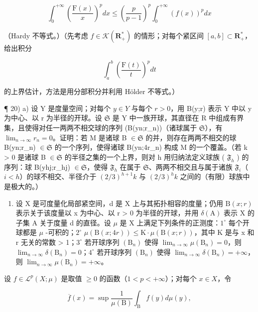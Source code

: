\[
\int_ {0} ^ {+ \infty} \left(\frac {\mathrm{F} (x)}{x}\right) ^ {p} d x \leqslant \left(\frac {p}{p - 1}\right) ^ {p} \int_ {0} ^ {+ \infty} (f (x)) ^ {p} d x
\]

（Hardy 不等式。）（先考虑 \(f \in \mathcal{K}(\mathbf{R}_+^*)\) 的情形；对每个紧区间 \([a, b] \subset \mathbf{R}_+^*\)，给出积分

\[
\int_ {a} ^ {b} \left(\frac {\mathrm{F} (t)}{t}\right) ^ {p} d t
\]

的上界估计，方法是用分部积分并利用 Hölder 不等式。）

¶ 20) a) 设 Y 是度量空间；对每个 \(y \in Y\) 与每个 \(r > 0\)，用 B(y;r) 表示 Y 中以 y 为中心、以 r 为半径的开球。设 \(\mathfrak{S}\) 是 Y 中一族开球，其直径在 R 中组成有界集，且使得对任一两两不相交球的序列 (B(yn;r\_n))（诸球属于 \(\mathfrak{S}\)），有 \(\lim_{n \to \infty} r_n = 0\)。证明：若 M 是诸球 B \(\in \mathfrak{S}\) 的并，则存在两两不相交的球 B(yn;r\_n) \(\in \mathfrak{S}\) 的一个序列，使得诸球 B(yn;4r\_n) 构成 M 的一个覆盖。（若 k \textgreater{} 0 是诸球 B \(\in \mathfrak{S}\) 的半径之集的一个上界，则对 h 用归纳法定义球族 ( \(\mathfrak{F}_h\) ) 的序列：球 B(yhj;r\_hj) \(\in \mathfrak{S}\)，使得 \(\mathfrak{F}_h\) 在属于 \(\mathfrak{S}\)、两两不相交且与属于诸族 \(\mathfrak{F}_i\)（\(i < h\)）的球不相交、半径介于 \((2/3)^{h+1}k\) 与 \((2/3)^h k\) 之间的（有限）球族中是极大的。）

\begin{enumerate}
\def\labelenumi{\alph{enumi})}
\setcounter{enumi}{1}
\tightlist
\item
  设 X 是可度量化局部紧空间，d 是 X 上与其拓扑相容的度量；仍用 \(\mathrm{B}(x;r)\) 表示关于该度量以 x 为中心、以 r \textgreater{} 0 为半径的开球，并用 \(\delta(\mathrm{A})\) 表示 X 的子集 A 关于度量 d 的直径。设 \(\mu\) 是 X 上满足下列条件的正测度：\(1^{\circ}\) 每个开球都是 \(\mu\) -可积的；\(2^{\circ}\) \(\mu(\mathrm{B}(x;4r)) \leqslant \mathrm{K} \cdot \mu(\mathrm{B}(x;r))\)，其中 K 是与 x 和 r 无关的常数 \textgreater{} 1；\(3^{\circ}\) 若开球序列 \((\mathrm{B}_{n})\) 使得 \(\lim_{n \to \infty} \mu(\mathrm{B}_{n}) = 0\)，则 \(\lim_{n \to \infty} \delta(\mathrm{B}_{n}) = 0\)；\(4^{\circ}\) 若开球序列 \((\mathrm{B}_{n})\) 使得 \(\lim_{n \to \infty} \delta(\mathrm{B}_{n}) = +\infty\)，则 \(\lim_{n \to \infty} \mu(\mathrm{B}_{n}) = +\infty\)。
\end{enumerate}

设 \(f \in \mathcal{L}^p(X; \mu)\) 是取值 \(\geqslant 0\) 的函数（\(1 < p < +\infty\)）；对每个 \(x \in X\)，令

\[
\overline {{{{f}}}} (x) = \sup \frac {1}{\mu (\mathrm{B})} \int_ {\mathrm{B}} f (y) d \mu (y),
\]

